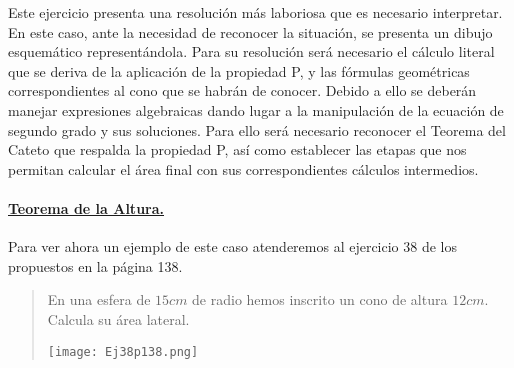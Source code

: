 	Este ejercicio presenta una resolución más laboriosa que es necesario interpretar. En este caso, ante la necesidad de reconocer la situación, se presenta un dibujo esquemático representándola. Para su resolución será necesario el cálculo literal que se deriva de la aplicación de la propiedad P, y las fórmulas geométricas correspondientes al cono que se habrán de conocer. Debido a ello se deberán manejar expresiones algebraicas dando lugar a la manipulación de la ecuación de segundo grado y sus soluciones. Para ello será necesario reconocer el Teorema del Cateto que respalda la propiedad P, así como establecer las etapas que nos permitan calcular el área final con sus correspondientes cálculos intermedios.
	
		

	\paragraph{\underline{Teorema de la Altura.}} Para ver ahora un ejemplo de este caso atenderemos al ejercicio 38 de los propuestos en la página 138.
	
	\begin{quote}\small
	\begin{multicols}{2}
		\begin{minipage}{7cm}
			En una esfera de $15cm$ de radio hemos inscrito un cono de altura $12cm$.
Calcula su área lateral.
		\end{minipage}
		
	\columnbreak
	
	\begin{center}
		\texttt{[image: Ej38p138.png]}
	\end{center}
	\end{multicols}
	\end{quote}
	
